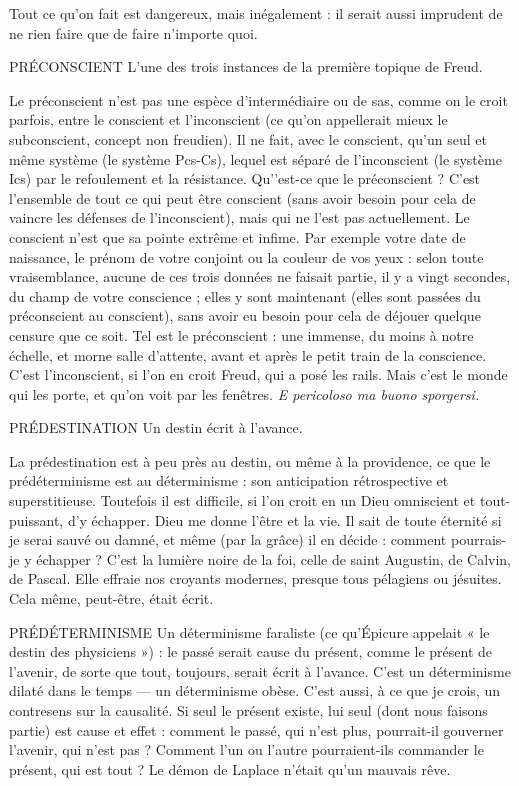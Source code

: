 Tout ce qu’on fait est dangereux, mais inégalement : il serait aussi imprudent
de ne rien faire que de faire n’importe quoi.

PRÉCONSCIENT  L’une des trois instances de la première topique de
Freud.

Le préconscient n’est pas une espèce d’intermédiaire ou de sas, comme on
le croit parfois, entre le conscient et l'inconscient (ce qu’on appellerait mieux le
subconscient, concept non freudien). Il ne fait, avec le conscient, qu’un seul et
même système (le système Pcs-Cs), lequel est séparé de l'inconscient (le système
Ics) par le refoulement et la résistance. Qu'’est-ce que le préconscient ? C’est
l’ensemble de tout ce qui peut être conscient (sans avoir besoin pour cela de
vaincre les défenses de l'inconscient), mais qui ne l’est pas actuellement. Le
conscient n’est que sa pointe extrême et infime. Par exemple votre date de naissance,
le prénom de votre conjoint ou la couleur de vos yeux : selon toute vraisemblance,
aucune de ces trois données ne faisait partie, il y a vingt secondes,
du champ de votre conscience ; elles y sont maintenant (elles sont passées du
préconscient au conscient), sans avoir eu besoin pour cela de déjouer quelque
censure que ce soit. Tel est le préconscient : une immense, du moins à notre
échelle, et morne salle d’attente, avant et après le petit train de la conscience.
C’est l'inconscient, si l’on en croit Freud, qui a posé les rails. Mais c’est le
monde qui les porte, et qu’on voit par les fenêtres. {\it E pericoloso ma buono sporgersi.}


PRÉDESTINATION Un destin écrit à l’avance.

La prédestination est à peu près au destin, ou même à
la providence, ce que le prédéterminisme est au déterminisme : son anticipation
rétrospective et superstitieuse. Toutefois il est difficile, si l’on croit en un
Dieu omniscient et tout-puissant, d’y échapper. Dieu me donne l'être et la vie.
Il sait de toute éternité si je serai sauvé ou damné, et même (par la grâce) il en
décide : comment pourrais-je y échapper ? C’est la lumière noire de la foi, celle
de saint Augustin, de Calvin, de Pascal. Elle effraie nos croyants modernes,
presque tous pélagiens ou jésuites. Cela même, peut-être, était écrit.

PRÉDÉTERMINISME Un déterminisme faraliste (ce qu’Épicure appelait
« le destin des physiciens ») : le passé serait cause du
présent, comme le présent de l’avenir, de sorte que tout, toujours, serait écrit à
l'avance. C’est un déterminisme dilaté dans le temps — un déterminisme obèse.
C'est aussi, à ce que je crois, un contresens sur la causalité. Si seul le présent
existe, lui seul (dont nous faisons partie) est cause et effet : comment le passé,
qui n'est plus, pourrait-il gouverner l'avenir, qui n’est pas ? Comment l’un ou
l’autre pourraient-ils commander le présent, qui est tout ? Le démon de Laplace
n’était qu’un mauvais rêve.

